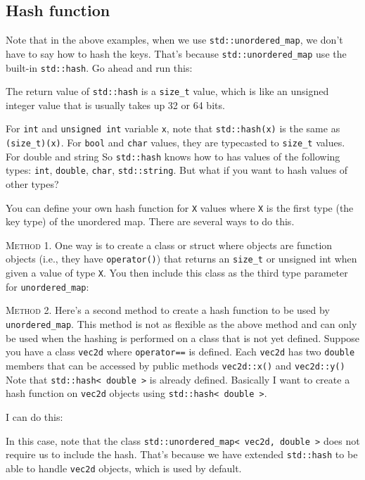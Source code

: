 \subsection{Hash function}

Note that in the above examples, when we use \verb!std::unordered_map!,
we don't have to say how to hash the keys.
That's because \verb!std::unordered_map! use the built-in
\verb!std::hash!.
Go ahead and run this:

{\small
{}
}

The return value of \verb!std::hash! is a \verb!size_t! value,
which is like an unsigned integer value
that is usually takes up 32 or 64 bits.

For \verb!int! and \verb!unsigned int! variable
\verb!x!, note that \verb!std::hash(x)!
is the same as \verb!(size_t)(x)!.
For \verb!bool! and \verb!char! values, they are typecasted to
\verb!size_t! values.
For double and string
So \verb!std::hash! knows how to has values of
the following types:
\verb!int!, \verb!double!, \verb!char!, \verb!std::string!.
But what if you want to hash values of other types?

You can define your own hash function for
\verb!X! values where \verb!X! is the first
type (the key type) of the unordered map.
There are several ways to do this.

\textsc{Method 1.}
One way is to create a class or struct where objects are function
objects (i.e., they have \verb!operator()!) that
returns an \verb!size_t! or unsigned int when given a value of type \verb!X!.
You then include this class as the third type parameter
for \verb!unordered_map!:


\vspace{-0.1cm}
{\small
{}
}

\textsc{Method 2.}
Here's a second method to create a hash function to be used
by \verb!unordered_map!.
This method is not as flexible as the above method
and can only be used when the hashing is performed
on a class that is not yet defined.
Suppose you have a class \verb!vec2d!
where \verb!operator==! is defined.
Each \verb!vec2d! has two \verb!double! members
that can be accessed by public methods
\verb!vec2d::x()! and
\verb!vec2d::y()!
Note that \verb!std::hash< double >! is already defined.
Basically I want to create a hash function on \verb!vec2d! objects
using \verb!std::hash< double >!.

I can do this:

\vspace{-0.1cm}
{\small
{}
}
In this case, note that the class
\verb!std::unordered_map< vec2d, double >!
does not require us to include the hash.
That's because we have extended \verb!std::hash!
to be able to handle \verb!vec2d! objects,
which is used by default.

